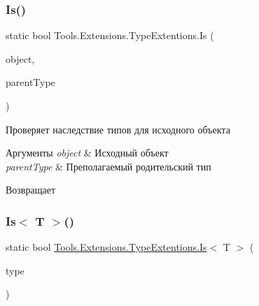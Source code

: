 \subsubsection{\texorpdfstring{Is()}{Is()}\hspace{0.1cm}{\footnotesize\ttfamily [2/2]}}
{\footnotesize\ttfamily static bool Tools.\+Extensions.\+Type\+Extentions.\+Is (\begin{DoxyParamCaption}\item[{this object @}]{object,  }\item[{Type}]{parent\+Type }\end{DoxyParamCaption})\hspace{0.3cm}{\ttfamily [static]}}



Проверяет наследствие типов для исходного объекта 


\begin{DoxyParams}{Аргументы}
{\em object} & Исходный объект\\
\hline
{\em parent\+Type} & Преполагаемый родительский тип\\
\hline
\end{DoxyParams}
\begin{DoxyReturn}{Возвращает}

\end{DoxyReturn}
\mbox{\label{class_tools_1_1_extensions_1_1_type_extentions_a180b1ab0f9c050aac47501f8c4973936}} 
\subsubsection{\texorpdfstring{Is$<$ T $>$()}{Is< T >()}\hspace{0.1cm}{\footnotesize\ttfamily [1/2]}}
{\footnotesize\ttfamily static bool \hyperlink{class_tools_1_1_extensions_1_1_type_extentions_a017a96cb151575a7764579ca8e229361}{Tools.\+Extensions.\+Type\+Extentions.\+Is}$<$ T $>$ (\begin{DoxyParamCaption}\item[{this Type}]{type }\end{DoxyParamCaption})\hspace{0.3cm}{\ttfamily [static]}}



